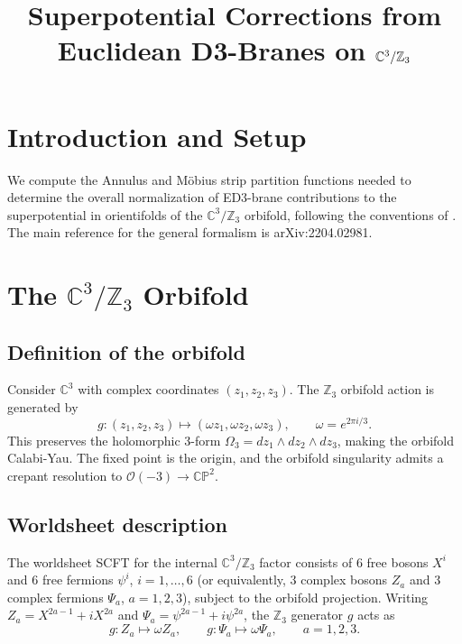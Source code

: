 \documentclass[11pt]{article}
\title{Superpotential Corrections from Euclidean D3-Branes on $\C^3/\Z_3$}
\author{}
\date{}
\newcommand{\Z}{\mathbb{Z}}
\newcommand{\C}{\mathbb{C}}
\newcommand{\CP}{\mathbb{CP}}
\newcommand{\cO}{\mathcal{O}}
\begin{document}
\maketitle

\tableofcontents

\section{Introduction and Setup}

We compute the Annulus and M\"obius strip partition functions needed to determine the overall normalization of ED3-brane contributions to the superpotential in orientifolds of the $\C^3/\Z_3$ orbifold, following the conventions of \cite{Sen:2021tpp,Alexandrov:2021shf}. The main reference for the general formalism is arXiv:2204.02981.

\section{The $\C^3/\Z_3$ Orbifold}

\subsection{Definition of the orbifold}

Consider $\C^3$ with complex coordinates $(z_1, z_2, z_3)$. The $\Z_3$ orbifold action is generated by
\begin{equation}
g: (z_1, z_2, z_3) \mapsto (\omega z_1, \omega z_2, \omega z_3), \qquad \omega = e^{2\pi i/3}.
\end{equation}
This preserves the holomorphic 3-form $\Omega_3 = dz_1 \wedge dz_2 \wedge dz_3$, making the orbifold Calabi-Yau. The fixed point is the origin, and the orbifold singularity admits a crepant resolution to $\cO(-3) \to \CP^2$.

\subsection{Worldsheet description}

The worldsheet SCFT for the internal $\C^3/\Z_3$ factor consists of 6 free bosons $X^i$ and 6 free fermions $\psi^i$, $i = 1,\ldots,6$ (or equivalently, 3 complex bosons $Z_a$ and 3 complex fermions $\Psi_a$, $a=1,2,3$), subject to the orbifold projection. Writing $Z_a = X^{2a-1} + i X^{2a}$ and $\Psi_a = \psi^{2a-1} + i\psi^{2a}$, the $\Z_3$ generator $g$ acts as
\begin{equation}\label{eq:gaction}
g: Z_a \mapsto \omega Z_a, \qquad g: \Psi_a \mapsto \omega \Psi_a, \qquad a = 1,2,3.
\end{equation}
\end{document}
